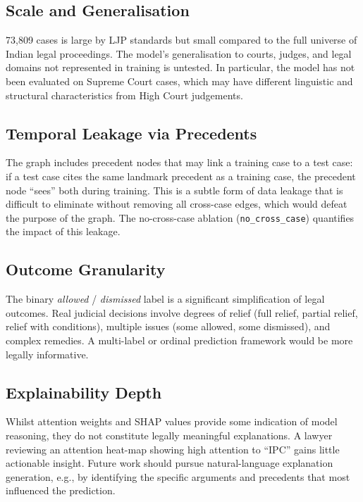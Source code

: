 \documentclass[12pt,a4paper]{report}
\begin{document}
\subsection{Scale and Generalisation}

73,809 cases is large by LJP standards but small compared to the full universe of Indian legal proceedings. The model's generalisation to courts, judges, and legal domains not represented in training is untested. In particular, the model has not been evaluated on Supreme Court cases, which may have different linguistic and structural characteristics from High Court judgements.

\subsection{Temporal Leakage via Precedents}

The graph includes precedent nodes that may link a training case to a test case: if a test case cites the same landmark precedent as a training case, the precedent node ``sees'' both during training. This is a subtle form of data leakage that is difficult to eliminate without removing all cross-case edges, which would defeat the purpose of the graph. The no-cross-case ablation (\texttt{no\_cross\_case}) quantifies the impact of this leakage.

\subsection{Outcome Granularity}

The binary \textit{allowed} / \textit{dismissed} label is a significant simplification of legal outcomes. Real judicial decisions involve degrees of relief (full relief, partial relief, relief with conditions), multiple issues (some allowed, some dismissed), and complex remedies. A multi-label or ordinal prediction framework would be more legally informative.

\subsection{Explainability Depth}

Whilst attention weights and SHAP values provide some indication of model reasoning, they do not constitute legally meaningful explanations. A lawyer reviewing an attention heat-map showing high attention to ``IPC'' gains little actionable insight. Future work should pursue natural-language explanation generation, e.g., by identifying the specific arguments and precedents that most influenced the prediction.
\end{document}
